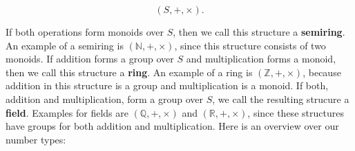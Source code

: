 \documentclass[tikz]{scrreprt}
\begin{document}
\[
(S,+,\times).
\]

If both operations form monoids over $S$,
then we call this structure a \textbf{semiring}.
An example of a semiring is $(\mathbb{N},+,\times)$,
since this structure consists of two monoids.
If addition forms a group over $S$ and 
multiplication forms a monoid, then we call
this structure a \textbf{ring}.
An example of a ring is $(\mathbb{Z},+,\times)$,
because addition in this structure is a group and
multiplication is a monoid.
If both, addition and multiplication, form
a group over $S$, we call the resulting strucure
a \textbf{field}. 
Examples for fields are $(\mathbb{Q},+,\times)$ and
$(\mathbb{R},+,\times)$, since these structures
have groups for both addition and multiplication.
Here is an overview over our number types:

\begin{center}
\end{center}
\end{document}
